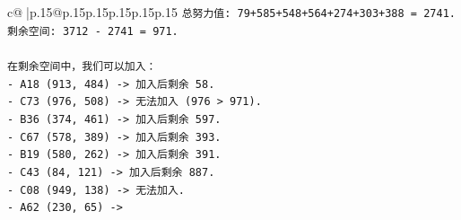 \documentclass{article}
\begin{document}
{\begin{supertabular}{c@{$\;$}|p{.15\linewidth}@{}p{.15\linewidth}p{.15\linewidth}p{.15\linewidth}p{.15\linewidth}p{.15\linewidth}}
{{{\texttt{总努力值: 79+585+548+564+274+303+388 = 2741.} \\
\texttt{剩余空间: 3712 {-} 2741 = 971.} \\
\\ 
\texttt{在剩余空间中，我们可以加入：} \\
\texttt{{-} A18 (913, 484) {-}> 加入后剩余 58.} \\
\texttt{{-} C73 (976, 508) {-}> 无法加入 (976 > 971).} \\
\texttt{{-} B36 (374, 461) {-}> 加入后剩余 597.} \\
\texttt{{-} C67 (578, 389) {-}> 加入后剩余 393.} \\
\texttt{{-} B19 (580, 262) {-}> 加入后剩余 391.} \\
\texttt{{-} C43 (84, 121) {-}> 加入后剩余 887.} \\
\texttt{{-} C08 (949, 138) {-}> 无法加入.} \\
\texttt{{-} A62 (230, 65) {-}>} \\
            }
        }
    }
     \\ \\


\end{supertabular}}
\end{document}
